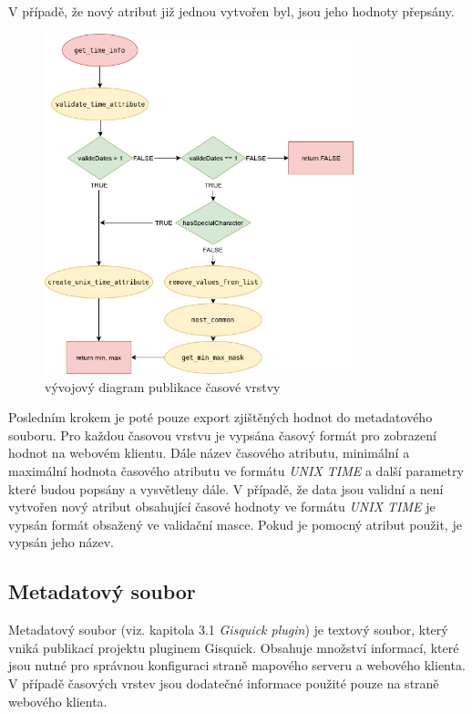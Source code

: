 \begin{itemize}
	V případě, že nový atribut již jednou vytvořen byl, jsou jeho hodnoty přepsány.
\end{itemize}

\begin{figure}[h!]
	\centering
	\includegraphics[width=0.8\textwidth]{../img/getTimeInfo.png}
	\caption{vývojový diagram publikace časové vrstvy}
	\label{fig:plugin-chart}
\end{figure}

Posledním krokem je poté pouze export zjištěných hodnot do metadatového souboru. Pro každou časovou vrstvu je vypsána časový formát pro zobrazení hodnot na webovém klientu. Dále název časového atributu, minimální a maximální hodnota časového atributu ve formátu \textit{UNIX TIME} a další parametry které budou popsány a vysvětleny dále. V případě, že data jsou validní a není vytvořen nový atribut obsahující časové hodnoty ve formátu \textit{UNIX TIME} je vypsán formát obsažený ve validační masce. Pokud je pomocný atribut použit, je vypsán jeho název.


\subsection{Metadatový soubor}

Metadatový soubor (viz. kapitola 3.1 \textit{Gisquick plugin}) je textový soubor, který vniká publikací projektu pluginem Gisquick. Obsahuje množství informací, které jsou nutné pro správnou konfiguraci straně mapového serveru a webového klienta. V případě časových vrstev jsou dodatečné informace použité pouze na straně webového klienta. 

